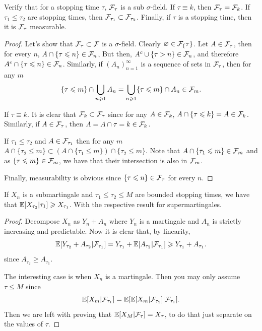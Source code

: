 \begin{exercise}[5.8]
	Verify that for a stopping time $\tau$, $\mathcal{F}_\tau$ is a sub $\sigma$-field.
	If $\tau \equiv k$, then $\mathcal{F}_\tau = \mathcal{F}_k$. If $\tau_1 \leq
	\tau_2$ are stopping times,
	then $\mathcal{F}_{\tau_1} \subset \mathcal{F}_{\tau_2}$. Finally, if $\tau$ is a
	stopping time,
	then it is $\mathcal{F}_\tau$ measurable.
\end{exercise}
\begin{proof}
	Let's show that $\mathcal{F}_{\tau} \subset \mathcal{F}$ is a $\sigma$-field.
	Clearly $\varnothing \in \mathcal{F}_\{\tau\}$.
	Let $A \in \mathcal{F}_{\tau}$, then for every $n$, $A \cap \{\tau \leqslant n\}
	\in \mathcal{F}_{n}$,
	But then, $A^c \cup \{\tau > n\} \in \mathcal{F}_n$, and therefore
	$A^c \cap \{\tau \leqslant n\} \in \mathcal{F}_n$. Similarly, if $(A_n)_{n =
	1}^{\infty}$ is
	a sequence of sets in $\mathcal{F}_{\tau}$, then for any $m$
	\[
		\{\tau \leqslant m\} \cap \bigcup_{n\geqslant 1} A_n = \bigcup_{n\geqslant 1}
		\{\tau \leqslant m \} \cap A_n \in \mathcal{F}_m.
	\]

	If $\tau \equiv k$. It is clear that $\mathcal{F}_k \subset \mathcal{F}_{\tau}$ since for any
	$A \in \mathcal{F}_{k}$, $A \cap \{\tau \leqslant k\} = A \in \mathcal{F}_k$.
	Similarly, if $A \in \mathcal{F}_{\tau}$, then $A = A \cap {\tau = k} \in \mathcal{F}_k$.

	If $\tau_1 \leq \tau_2$ and $A \in \mathcal{F}_{\tau_1}$ then for any $m$
	$A \cap \{\tau_2 \leq m\} \subset (A \cap \{\tau_1 \leq m\}) \cap
	\{\tau_2 \leq m\}$.
	Note that $A \cap \{\tau_1 \leqslant m\} \in \mathcal{F}_m$ and as $\{\tau \leqslant
	m\} \in \mathcal{F}_m$,
	we have that their intersection is also in $\mathcal{F}_m$.

	Finally, measurability is obvious since $\{\tau \leqslant n\} \in \mathcal{F}_{\tau}$ for
	every $n$.
\end{proof}

\begin{exercise}[5.10]
	If $X_n$ is a submartingale and $\tau_1 \leq \tau_2 \leq M$ are
	bounded stopping times,
	we have that $\mathbb{E}[X_{\tau_2} | \tau_1] \geqslant X_{\tau_1}$. With the respective
	result for supermartingales.
\end{exercise}
\begin{proof}
	Decompose $X_n$ as $Y_n + A_n$ where $Y_n$ is a martingale and
	$A_n$ is strictly increasing and
	predictable. Now it is clear that, by linearity,
	\[
		\mathbb{E}[Y_{\tau_2} + A_{\tau_2} | \mathcal{F}_{\tau_1}] = Y_{\tau_1} +
		\mathbb{E}[A_{\tau_2} | \mathcal{F}_{\tau_1}] \geqslant Y_{\tau_1} + A_{\tau_1}.
	\]
	since $A_{\tau_2} \geq A_{\tau_1}$.

	The interesting case is when $X_n$ is a martingale. Then you may
	only assume $\tau \leq M$ since
	\[
		\mathbb{E}[X_m | \mathcal{F}_{\tau_1}] = \mathbb{E}[\mathbb{E}[X_m | \mathcal{F}_{\tau_2}] | \mathcal{F}_{\tau_1}].
	\]
	Then we are left with proving that $\mathbb{E}[X_M | \mathcal{F}_{\tau}] =
	X_{\tau}$, to do that just separate
	on the values of $\tau$.
\end{proof}


